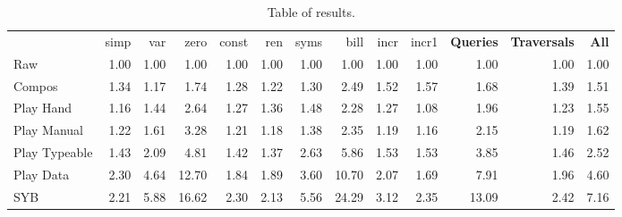 \documentclass[preprint]{sigplanconf}
\begin{document}
\begin{table}
\caption{Table of results.}
\label{fig:results}
\vspace{3mm}
\begin{tabular*}{\textwidth}{lrrrrrrrrrrrr}
 & simp & var & zero & const & ren & syms & bill & incr & incr1 & \textbf{Queries} & \textbf{Traversals} & \textbf{All} \\
Raw            &  1.00 &  1.00 &  1.00 &  1.00 &  1.00 &  1.00 &  1.00 &  1.00 &  1.00 &  1.00 &  1.00 &  1.00 \\
Compos         &  1.34 &  1.17 &  1.74 &  1.28 &  1.22 &  1.30 &  2.49 &  1.52 &  1.57 &  1.68 &  1.39 &  1.51 \\
Play Hand      &  1.16 &  1.44 &  2.64 &  1.27 &  1.36 &  1.48 &  2.28 &  1.27 &  1.08 &  1.96 &  1.23 &  1.55 \\
Play Manual    &  1.22 &  1.61 &  3.28 &  1.21 &  1.18 &  1.38 &  2.35 &  1.19 &  1.16 &  2.15 &  1.19 &  1.62 \\
Play Typeable  &  1.43 &  2.09 &  4.81 &  1.42 &  1.37 &  2.63 &  5.86 &  1.53 &  1.53 &  3.85 &  1.46 &  2.52 \\
Play Data      &  2.30 &  4.64 & 12.70 &  1.84 &  1.89 &  3.60 & 10.70 &  2.07 &  1.69 &  7.91 &  1.96 &  4.60 \\
SYB            &  2.21 &  5.88 & 16.62 &  2.30 &  2.13 &  5.56 & 24.29 &  3.12 &  2.35 & 13.09 &  2.42 &  7.16 \\
\hline
\end{tabular*}
\end{table}
\end{document}
